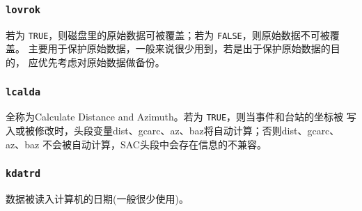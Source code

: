 \subsubsection{\texttt{lovrok}}
若为 \texttt{TRUE}，则磁盘里的原始数据可被覆盖；若为 \texttt{FALSE}，则原始数据不可被覆盖。
主要用于保护原始数据，一般来说很少用到，若是出于保护原始数据的目的，
应优先考虑对原始数据做备份。

\subsubsection{\texttt{lcalda}}
全称为Calculate Distance and Azimuth。若为 \texttt{TRUE}，则当事件和台站的坐标被
写入或被修改时，头段变量dist、gcarc、az、baz将自动计算；否则dist、gcarc、az、baz
不会被自动计算，SAC头段中会存在信息的不兼容。

\subsubsection{\texttt{kdatrd}}
数据被读入计算机的日期(一般很少使用)。
